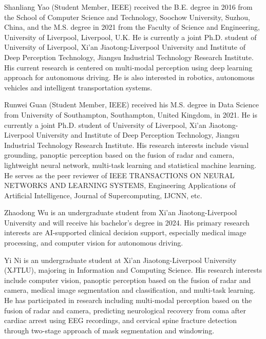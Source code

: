 \documentclass[lettersize,journal]{IEEEtran}
\begin{document}



\begin{IEEEbiography}{Shanliang Yao} (Student Member, IEEE) received the B.E. degree in 2016 from the School of Computer Science and Technology, Soochow University, Suzhou, China, and the M.S. degree in 2021 from the Faculty of Science and Engineering, University of Liverpool, Liverpool, U.K. He is currently a joint Ph.D. student of University of Liverpool, Xi'an Jiaotong-Liverpool University and Institute of Deep Perception Technology, Jiangsu Industrial Technology Research Institute. His current research is centered on multi-modal perception using deep learning approach for autonomous driving. He is also interested in robotics, autonomous vehicles and intelligent transportation systems.
\end{IEEEbiography}
\vskip -1cm
\begin{IEEEbiography}
{Runwei Guan} (Student Member, IEEE) received his M.S. degree in Data Science from University of Southampton, Southampton, United Kingdom, in 2021. He is currently a joint Ph.D. student of University of Liverpool, Xi'an Jiaotong-Liverpool University and Institute of Deep Perception Technology, Jiangsu Industrial Technology Research Institute. His research interests include visual grounding, panoptic perception based on the fusion of radar and camera, lightweight neural network, multi-task learning and statistical machine learning. He serves as the peer reviewer of IEEE TRANSACTIONS ON NEURAL NETWORKS AND LEARNING SYSTEMS, Engineering Applications of Artificial Intelligence, Journal of Supercomputing, IJCNN, etc.
\end{IEEEbiography}
\vskip -1cm
\begin{IEEEbiography}
{Zhaodong Wu} is an undergraduate student from Xi'an Jiaotong-Liverpool University and will receive his bachelor's degree in 2024. His primary research interests are AI-supported clinical decision support, especially medical image processing, and computer vision for autonomous driving.
\end{IEEEbiography}
\vskip -1cm
\begin{IEEEbiography}
{Yi Ni} is an undergraduate student at Xi'an Jiaotong-Liverpool University (XJTLU), majoring in Information and Computing Science. His research interests include computer vision, panoptic perception based on the fusion of radar and camera, medical image segmentation and classification, and multi-task learning. He has participated in research including multi-modal perception based on the fusion of radar and camera, predicting neurological recovery from coma after cardiac arrest using EEG recordings, and cervical spine fracture detection through two-stage approach of mask segmentation and windowing.
\end{IEEEbiography}
\end{document}
